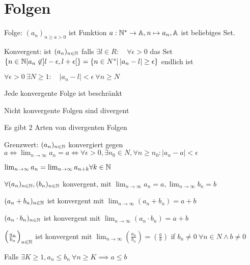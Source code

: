
\section{Folgen}

\begin{compactdesc}
    \item[Folge:] $\left( a_n \right)_{n \ge a  > 0}$ ist Funktion $a:\mathbb{N}^* \to \mathbb{A}, n \mapsto a_n, \mathbb{A}$ ist beliebiges Set.
    \item[Konvergent:] ist $(a_n)_{n \in \mathbb{N}}$ falls $\exists l \in R: \quad \forall \epsilon > 0$ das Set $\left\{ n \in \mathbb{N} | a_n \not\in  ] l - \epsilon, l + \epsilon[ \right\} = \left\{ n \in N^* | \left| a_n - l \right| \ge \epsilon  \right\} $ endlich ist
        \begin{compactitem}
            \item $\forall  \epsilon > 0 \ \exists  N \ge 1: \quad |a_n - l| < \epsilon \ \forall n \ge N$
            \item Jede konvergente Folge ist beschränkt
            \item Nicht konvergente Folgen sind divergent
            \item Es gibt $2$ Arten von divergenten Folgen
        \end{compactitem}
    \item[Grenzwert:] $(a_n)_{n \in \mathbb{N}}$ konvergiert gegen $a \iff \lim_{n \to \infty} a_n = a \iff \forall \epsilon > 0, \exists n_0 \in N, \forall n \ge n_0: \left| a_n - a \right| < \epsilon$
        \begin{compactitem}
            \item $\lim_{n \to \infty} a_n = \lim_{n \to \infty} a_{n+k} \forall k \in \mathbb{N} $
        \end{compactitem}
\end{compactdesc}

$\forall (a_n)_{n \in \mathbb{N}}, (b_n)_{n \in \mathbb{N}}$ konvergent, mit $\lim_{n \to \infty} a_n = a, \lim_{n \to \infty} b_n = b$
\begin{compactenum}
   \item $(a_n + b_n)_{n \in \mathbb{N}}$ ist konvergent mit $\lim_{n \to \infty} (a_n + b_n) = a + b$
   \item $(a_n \cdot  b_n)_{n \in \mathbb{N}}$ ist konvergent mit $\lim_{n \to \infty} (a_n \cdot  b_n) = a + b$
   \item $\left( \frac{a_n}{b_n} \right) _{n \in \mathbb{N}}$ ist konvergent mit $\lim_{n \to \infty} \left( \frac{a_n}{b_n} \right) = \left( \frac{a}{b} \right)$ if $b_n \neq 0 \ \forall n \in N \wedge  b \neq 0$
    \item Falls $\exists K \ge 1, a_n \le  b_n \ \forall n \ge K \implies a \le b$
\end{compactenum}

